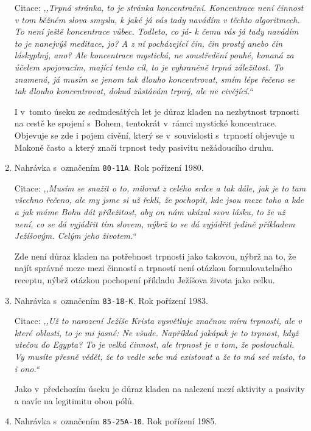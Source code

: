 \begin{enumerate}
{      Citace: \textit{%
        ,,Trpná stránka, to je stránka koncentrační. Koncentrace není činnost v
        tom běžném slova smyslu, k jaké já vás tady navádím v těchto
        algoritmech. To není ještě koncentrace vůbec. Todleto, co já- k čemu vás
        já tady navádím to je nanejvýš meditace, jo? A z ní pocházející čin, čin
        prostý anebo čin láskyplný, ano? Ale koncentrace mystická, ne
        soustředění pouhé, konaná za účelem spojovacím, mající tento cíl, to je
        vyhraněně trpná záležitost. To znamená, já musím se jenom tak dlouho
        koncentrovat, smím lépe řečeno se tak dlouho koncentrovat, dokud
        zůstávám trpný, ale ne civějící.``
      }

      I v~tomto úseku ze sedmdesátých let je důraz kladen na nezbytnost trpnosti
      na cestě ke spojení s~Bohem, tentokrát v~rámci mystické koncentrace.
      Objevuje se zde i pojem civění, který se v~souvislosti s~trpností objevuje
      u Makoně často a který značí trpnost tedy pasivitu nežádoucího druhu.
  }
  \item{
      Nahrávka s~označením \texttt{80-11A}. Rok pořízení 1980.

      Citace: \textit{%
        ,,Musím se snažit o to, milovat z celého srdce a tak dále, jak je to tam
        všechno řečeno, ale my jsme si už řekli, že pochopit, kde jsou meze toho
        a kde a jak máme Bohu dát příležitost, aby on nám ukázal svou lásku, to
        že už není, co se dá vyjádřit tím slovem, nýbrž to se dá vyjádřit jedině
        příkladem Ježíšovým. Celým jeho životem.``
      }

      Zde není důraz kladen na potřebnost trpnosti jako takovou, nýbrž na to, že
      najít správné meze mezi činností a trpností není otázkou formulovatelného
      receptu, nýbrž otázkou pochopení příkladu Ježíšova života jako celku.
  }
  \item{
      Nahrávka s~označením \texttt{83-18-K}. Rok pořízení 1983.

      Citace: \textit{%
        ,,Už to narození Ježíše Krista vysvětluje značnou míru trpnosti, ale v
        které oblasti, to je mi jasné: Ne všude. Například jakápak je to
        trpnost, když utečou do Egypta? To je velká činnost, ale trpnost je v
        tom, že poslouchali. Vy musíte přesně vědět, že to vedle sebe má
        existovat a že to má své místo, to i ono.``
      }

      Jako v~předchozím úseku je důraz kladen na nalezení mezí aktivity a
      pasivity a navíc na legitimitu obou pólů.
  }
  \item{
      Nahrávka s~označením \texttt{85-25A-10}. Rok pořízení 1985.

}
\end{enumerate}
